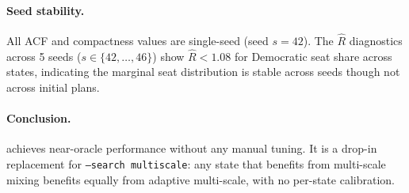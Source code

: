 \paragraph{Seed stability.}
All ACF and compactness values are single-seed (seed $s = 42$).
The $\hat{R}$ diagnostics across 5 seeds ($s \in \{42, \ldots, 46\}$)
show $\hat{R} < 1.08$ for Democratic seat share across states, indicating
the marginal seat distribution is stable across seeds though not across
initial plans.

\paragraph{Conclusion.}
\ams{} achieves near-oracle performance without any manual tuning.
It is a drop-in replacement for \texttt{--search multiscale}: any state that
benefits from multi-scale mixing benefits equally from adaptive multi-scale,
with no per-state calibration.
